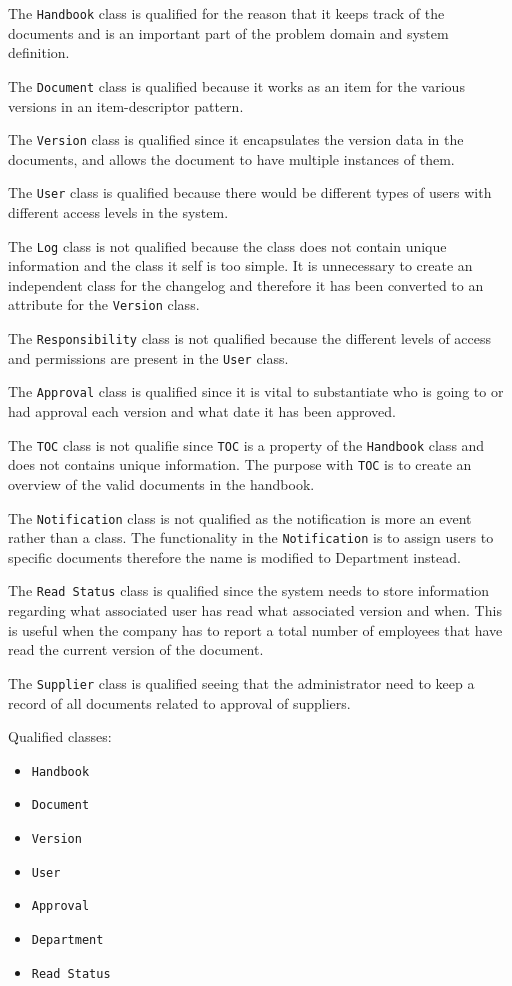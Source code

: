 The \texttt{Handbook} class is qualified for the reason that it keeps track of the documents and is an important part of the problem domain and system definition.

The \texttt{Document} class is qualified because it works as an item for the various versions in an item-descriptor pattern.

The \texttt{Version} class is qualified since it encapsulates the version data in the documents, and allows the document to have multiple instances of them.

The \texttt{User} class is qualified because there would be different types of users with different access levels in the system.

The \texttt{Log} class is not qualified because the class does not contain unique information and the class it self is too simple. It is unnecessary to create an independent class for the changelog and therefore it has been converted to an attribute for the \texttt{Version} class.

The \texttt{Responsibility} class is not qualified because the different levels of access and permissions are present in the \texttt{User} class.

The \texttt{Approval} class is qualified since it is vital to substantiate who is going to or had approval each version and what date it has been approved.

The \texttt{TOC} class is not qualifie since \texttt{TOC} is a property of the \texttt{Handbook} class and does not contains unique information. The purpose with \texttt{TOC} is to create an overview of the valid documents in the handbook.

The \texttt{Notification} class is not qualified as the notification is more an event rather than a class. The functionality in the \texttt{Notification} is to assign users to specific documents therefore the name is modified to Department instead.

The \texttt{Read Status} class is qualified since the system needs to store information regarding what associated user has read what associated version and when. This is useful when the company has to report a total number of employees that have read the current version of the document.

The \texttt{Supplier} class is qualified seeing that the administrator need to keep a record of all documents related to approval of suppliers. %

Qualified classes:
\begin{itemize}
	\item \texttt{Handbook}
	\item \texttt{Document}
	\item \texttt{Version}
	\item \texttt{User}
	\item \texttt{Approval}
	\item \texttt{Department}
	\item \texttt{Read Status}
\end{itemize}

